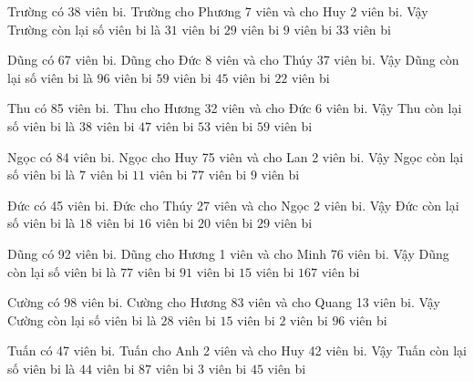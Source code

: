 \documentclass[12pt,a4paper]{article}
\begin{document}
\begin{ex}
Trường có 38 viên bi. Trường cho Phương 7 viên và cho Huy 2 viên bi. Vậy Trường còn lại số viên bi là
 \choice 
{$31$ viên bi}
{\True $29$ viên bi}
{$9$ viên bi}
{$33$ viên bi}
\end{ex}
\begin{ex}
Dũng có 67 viên bi. Dũng cho Đức 8 viên và cho Thúy 37 viên bi. Vậy Dũng còn lại số viên bi là
 \choice 
{$96$ viên bi}
{$59$ viên bi}
{$45$ viên bi}
{\True $22$ viên bi}
\end{ex}
\begin{ex}
Thu có 85 viên bi. Thu cho Hương 32 viên và cho Đức 6 viên bi. Vậy Thu còn lại số viên bi là
 \choice 
{$38$ viên bi}
{\True $47$ viên bi}
{$53$ viên bi}
{$59$ viên bi}
\end{ex}
\begin{ex}
Ngọc có 84 viên bi. Ngọc cho Huy 75 viên và cho Lan 2 viên bi. Vậy Ngọc còn lại số viên bi là
 \choice 
{\True $7$ viên bi}
{$11$ viên bi}
{$77$ viên bi}
{$9$ viên bi}
\end{ex}
\begin{ex}
Đức có 45 viên bi. Đức cho Thúy 27 viên và cho Ngọc 2 viên bi. Vậy Đức còn lại số viên bi là
 \choice 
{$18$ viên bi}
{\True $16$ viên bi}
{$20$ viên bi}
{$29$ viên bi}
\end{ex}
\begin{ex}
Dũng có 92 viên bi. Dũng cho Hương 1 viên và cho Minh 76 viên bi. Vậy Dũng còn lại số viên bi là
 \choice 
{$77$ viên bi}
{$91$ viên bi}
{\True $15$ viên bi}
{$167$ viên bi}
\end{ex}
\begin{ex}
Cường có 98 viên bi. Cường cho Hương 83 viên và cho Quang 13 viên bi. Vậy Cường còn lại số viên bi là
 \choice 
{$28$ viên bi}
{$15$ viên bi}
{\True $2$ viên bi}
{$96$ viên bi}
\end{ex}
\begin{ex}
Tuấn có 47 viên bi. Tuấn cho Anh 2 viên và cho Huy 42 viên bi. Vậy Tuấn còn lại số viên bi là
 \choice 
{$44$ viên bi}
{$87$ viên bi}
{\True $3$ viên bi}
{$45$ viên bi}
\end{ex}
\end{document}
